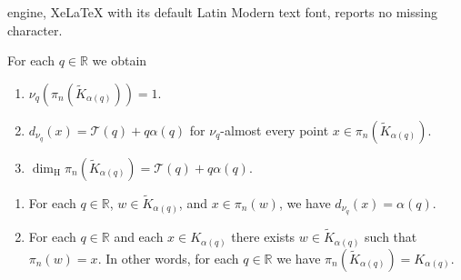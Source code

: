 \documentclass[10pt,a4paper]{amsart}
\newcommand{\R}{\mathbb{R}}
\begin{document}
engine, XeLaTeX with its default Latin Modern text font, reports no missing character.
\begin{lemma}\label{Lemma3}
    For each $q\in \R$ we obtain
    \begin{enumerate}
        \item $\nu_{q}(\pi_{n}(\tilde{K}_{\alpha(q)}))=1$.
        \item $d_{\nu_{q}}(x)=\mathcal{T}(q)+q\alpha(q)$ for $\nu_{q}$-almost every point $x\in \pi_{n}(\tilde{K}_{\alpha(q)})$.
        \item $\dim_{\mathrm{H}}\pi_{n}(\tilde{K}_{\alpha(q)})=\mathcal{T}(q)+q\alpha(q)$.
    \end{enumerate}
\end{lemma}

\begin{proposition}\label{Proposition 1}
\hfill    \begin{enumerate}
        \item For each $q\in \mathbb{R}$, $w\in \tilde{K}_{\alpha(q)}$, and $x\in \pi_{n}(w)$, we have $d_{\nu_{q}}(x)=\alpha(q)$.
        \item For each $q\in \mathbb{R}$ and each $x\in K_{\alpha(q)}$ there exists $w\in \tilde{K}_{\alpha(q)}$ such that $\pi_{n}(w)=x$.  In other words, for each $q\in \mathbb{R}$ we have $\pi_{n}(\tilde{K}_{\alpha(q)})=K_{\alpha(q)}$. 
    \end{enumerate}
\end{proposition}
\end{document}
